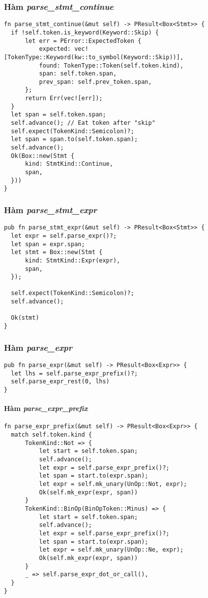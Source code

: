 {\subsubsection{Hàm \textit{parse\_stmt\_continue}}
\label{ap1:stmt_skip}
\begin{lstlisting}
fn parse_stmt_continue(&mut self) -> PResult<Box<Stmt>> {
  if !self.token.is_keyword(Keyword::Skip) {
      let err = PError::ExpectedToken {
          expected: vec![TokenType::Keyword(kw::to_symbol(Keyword::Skip))],
          found: TokenType::Token(self.token.kind),
          span: self.token.span,
          prev_span: self.prev_token.span,
      };
      return Err(vec![err]);
  }
  let span = self.token.span;
  self.advance(); // Eat token after "skip"
  self.expect(TokenKind::Semicolon)?;
  let span = span.to(self.token.span);
  self.advance();
  Ok(Box::new(Stmt {
      kind: StmtKind::Continue,
      span,
  }))
}
\end{lstlisting}

\subsubsection{Hàm \textit{parse\_stmt\_expr}}
\label{ap1:stmt_expr}
\begin{lstlisting}
pub fn parse_stmt_expr(&mut self) -> PResult<Box<Stmt>> {
  let expr = self.parse_expr()?;
  let span = expr.span;
  let stmt = Box::new(Stmt {
      kind: StmtKind::Expr(expr),
      span,
  });

  self.expect(TokenKind::Semicolon)?;
  self.advance();

  Ok(stmt)
}
\end{lstlisting}

\subsubsection{Hàm \textit{parse\_expr}}
\label{ap1:expr}
\begin{lstlisting}
pub fn parse_expr(&mut self) -> PResult<Box<Expr>> {
  let lhs = self.parse_expr_prefix()?;
  self.parse_expr_rest(0, lhs)
}
\end{lstlisting}

\paragraph{Hàm \textit{parse\_expr\_prefix}}
\label{ap1:expr_prefix}
\begin{lstlisting}
fn parse_expr_prefix(&mut self) -> PResult<Box<Expr>> {
  match self.token.kind {
      TokenKind::Not => {
          let start = self.token.span;
          self.advance();
          let expr = self.parse_expr_prefix()?;
          let span = start.to(expr.span);
          let expr = self.mk_unary(UnOp::Not, expr);
          Ok(self.mk_expr(expr, span))
      }
      TokenKind::BinOp(BinOpToken::Minus) => {
          let start = self.token.span;
          self.advance();
          let expr = self.parse_expr_prefix()?;
          let span = start.to(expr.span);
          let expr = self.mk_unary(UnOp::Ne, expr);
          Ok(self.mk_expr(expr, span))
      }
      _ => self.parse_expr_dot_or_call(),
  }
}
\end{lstlisting}

}
